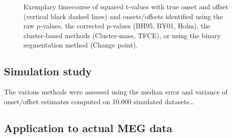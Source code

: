 \documentclass[
  doc,
  floatsintext,
  longtable,
  a4paper,
  nolmodern,
  notxfonts,
  notimes,
  colorlinks=true,linkcolor=blue,citecolor=blue,urlcolor=blue]{apa7}
\begin{document}
\begin{figure}[!htb]

\caption{\label{fig-corrections}Exemplary timecourse of squared t-values
with true onset and offset (vertical black dashed lines) and
onsets/offsets identified using the raw p-values, the corrected p-values
(BH95, BY01, Holm), the cluster-based methods (Cluster-mass, TFCE), or
using the binary segmentation method (Change point).}


\end{figure}%

\newpage

\subsection{Simulation study}\label{simulation-study}

The various methods were assessed using the median error and variance of
onset/offset estimates computed on 10.000 simulated datasets\ldots{}

\subsection{Application to actual MEG
data}\label{application-to-actual-meg-data}
\end{document}
